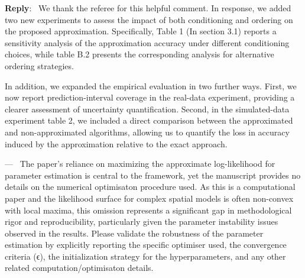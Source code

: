 \documentclass[12pt]{article}
\newcommand{\0}{\mathbf{0}}
\newcounter{reviewer}
\newcounter{point}[reviewer]
\renewcommand{\thepoint}{P\,\thereviewer.\arabic{point}}
\newenvironment{point}
   {\refstepcounter{point} \bigskip \noindent {\textbf{Point~\thepoint} } ---\ }
   {\par }
\newenvironment{reply}
   {\medskip \noindent \begin{sf}\color{Blue}\textbf{Reply}:\  }
   {\medskip \end{sf}}
\begin{document}
\begin{reply}
We thank the referee for this helpful comment. In response, we added two new experiments to assess the impact of both conditioning and ordering on the proposed approximation. Specifically, Table 1 (In section 3.1) reports a sensitivity analysis of the approximation accuracy under different conditioning choices, while table B.2 presents the corresponding analysis for alternative ordering strategies. 

In addition, we expanded the empirical evaluation in two further ways. First, we now report prediction-interval coverage in the real-data experiment, providing a clearer assessment of uncertainty quantification. Second, in the simulated-data experiment table 2, we included a direct comparison between the approximated and non-approximated algorithms, allowing us to quantify the loss in accuracy induced by the approximation relative to the exact approach.
\end{reply}







\begin{point}
    The paper’s reliance on maximizing the approximate log-likelihood for
parameter estimation is central to the framework, yet the manuscript
provides no details on the numerical optimisaton procedure used. As
this is a computational paper and the likelihood surface for complex
spatial models is often non-convex with local maxima, this omission represents
a significant gap in methodological rigor and reproducibility, particularly
given the parameter instability issues observed in the results.
Please validate the robustness of the parameter estimation by explicitly
reporting the specific optimiser used, the convergence criteria (ϵ), the
initialization strategy for the hyperparameters, and any other related
computation/optimisaton details.
\end{point}
\end{document}
